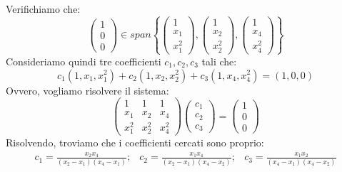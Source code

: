 \begin{example}
Verifichiamo che:  \[\left(\begin{array}{c}
  1\\
  0\\
  0
\end{array}\right)\in span\left\{\left(\begin{array}{c}
  1\\
  x_1\\
  x_1^2
\end{array}\right),\left(\begin{array}{c}
  1\\
  x_2\\
  x_2^2
\end{array}\right),\left(\begin{array}{c}
  1\\
  x_4\\
  x_4^2
\end{array}\right)\right\}\]
Consideriamo quindi tre coefficienti $c_1,c_2,c_3$ tali che:
\begin{equation}\label{eq:span}
    c_1(1,x_1,x_1^2)+c_2(1,x_2,x_2^2)+c_3(1,x_4,x_4^2)=(1,0,0)
\end{equation}
Ovvero, vogliamo risolvere il sistema: 
\[
\left(\begin{array}{ccc}
  1 & 1 & 1\\
  x_1 & x_2 & x_4\\
  x_1^2 & x_2^2 & x_4^2
\end{array}\right) \left(\begin{array}{c}
  c_1\\
  c_2\\
  c_3
\end{array}\right)=\left(\begin{array}{c}
  1\\
  0\\
  0
\end{array}\right)
\]
Risolvendo, troviamo che i coefficienti cercati sono proprio:
\[\begin{array}{ccc}
     c_1=\frac{ x_2 x_4}{(x_2 - x_1)  (x_4 - x_1)}; &
c_2 = \frac{x_1  x_4}{(x_2 - x_1)(x_4 - x_2)}; &
c_3 = \frac{x_1 x_2 }{(x_4 - x_1)  (x_4 - x_2)}
\end{array}\]
\end{example}

